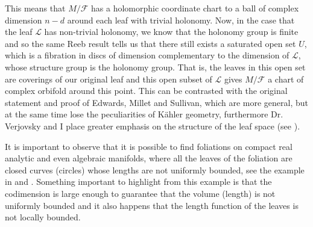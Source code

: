 \documentclass[12pt,twoside,a4paper]{report}
\begin{document}
This means that $M/\mathcal{F}$ has a holomorphic coordinate chart to a ball of complex dimension $n-d$ around each leaf
with trivial holonomy. Now, in the case that the leaf $\mathcal{L}$ has non-trivial holonomy, we know that the holonomy group is
finite and so the same Reeb result tells us that there still exists a saturated open set $U$, which is a fibration in
discs of dimension complementary to the dimension of $\mathcal{L}$, whose structure group is the holonomy group.
That is, the leaves in this open set are coverings of our original leaf and this open subset of $\mathcal{L}$ gives $M/\mathcal{F}$
a chart of complex orbifold around this point.
This can be contrasted with the original statement and proof of Edwards, Millet and Sullivan, which are more general, but at the same time lose
the peculiarities of Kähler geometry, furthermore Dr. Verjovsky and I place greater emphasis on the structure of the
leaf space (see \cite{EMS}).

It is important to observe that it is possible to find foliations on compact real analytic and even algebraic manifolds, where
all the leaves of the foliation are closed curves (circles) whose lengths are not uniformly bounded, see the example in \cite{E-V} and \cite{Epstein2}.
Something important to highlight from this example is that the codimension is large enough
to guarantee that the volume (length) is not uniformly bounded and it also happens that the length function of the leaves
is not locally bounded.
\end{document}
